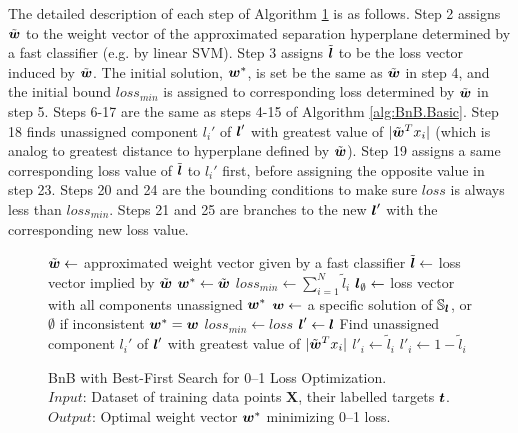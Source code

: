 The detailed description of each step of Algorithm \ref{alg:BnB.BestFirst} is as follows. Step 2 assigns $\tilde{\boldsymbol{w}}$ to the weight vector of the approximated separation hyperplane determined by a fast classifier (e.g. by linear SVM). Step 3 assigns $\tilde{\boldsymbol{l}}$ to be the loss vector induced by $\tilde{\boldsymbol{w}}$. The initial solution, $\boldsymbol{w}^*$, is set be the same as $\tilde{\boldsymbol{w}}$ in step 4, and the initial bound $loss_{min}$ is assigned to corresponding loss determined by $\tilde{\boldsymbol{w}}$ in step 5. Steps 6-17 are the same as steps 4-15 of Algorithm \ref{alg:BnB.Basic}. Step 18 finds unassigned component $l_i'$ of $\boldsymbol{l}'$ with greatest value of $|\tilde{\boldsymbol{w}}^Tx_i|$ (which is analog to greatest distance to hyperplane defined by $\tilde{\boldsymbol{w}}$). Step 19 assigns a same corresponding loss value of $\tilde{\boldsymbol{l}}$ to $l_i'$ first, before assigning the opposite value in step 23. Steps 20 and 24 are the bounding conditions to make sure $loss$ is always less than $loss_{min}$. Steps 21 and 25 are branches to the new $\boldsymbol{l}'$ with the corresponding new loss value.
 
\begin{figure}
\caption{
BnB with Best-First Search for 0--1 Loss Optimization. \\
\text{\hspace{2.2cm}} $Input$: Dataset of training data points $ \boldsymbol{X}$, their labelled targets $\boldsymbol{t}$. \\
\text{\hspace{2.2cm}} $Output$: Optimal weight vector $\boldsymbol{w}^*$ minimizing 0--1 loss.
}
\label{alg:BnB.BestFirst}
\begin{algorithmic}[1]
\State $\tilde{\boldsymbol{w}} \gets $ approximated weight vector given by a fast classifier
\State $\tilde{\boldsymbol{l}} \gets $ loss vector implied by $\tilde{\boldsymbol{w}}$
\State $\boldsymbol{w}^* \gets \tilde{\boldsymbol{w}}$
\State $loss_{min} \gets \sum_{i=1}^N \tilde{l}_i$ 
\State $\boldsymbol{l}_\emptyset \gets $ loss vector with all components unassigned
\State {}
\State \Return $\boldsymbol{w}^*$
\Statex
{}
      \State $\boldsymbol{w} \gets$ a specific solution of $\mathbb{S}_{\boldsymbol{l}}$, or $\emptyset$ if inconsistent 
      \If {$\w \not= \emptyset$} 
         \State $\boldsymbol{w}^* = \boldsymbol{w}$ 
         \State $loss_{min} \gets loss$
      \EndIf
   \Else
      \State $\boldsymbol{l}' \gets \boldsymbol{l}$
      \State Find unassigned component $l_i'$ of $\boldsymbol{l}'$ with greatest value of $|\tilde{\boldsymbol{w}}^Tx_i|$
      \State $l'_i \gets \tilde{l}_i$
         \State {}
      \EndIf
      \State $l'_i \gets 1 - \tilde{l}_i$
         \State {}
      \EndIf
   \EndIf
\EndProcedure
\Statex
\EndFunction
\end{algorithmic}
\end{figure}



